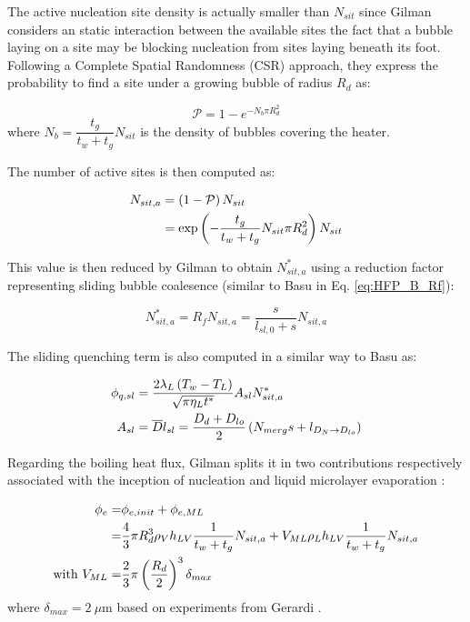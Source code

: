 The active nucleation site density is actually smaller than $N_{sit}$ since Gilman considers an static interaction between the available sites \ie the fact that a bubble laying on a site may be blocking nucleation from sites laying beneath its foot. Following a Complete Spatial Randomness (CSR) approach, they express the probability to find a site under a growing bubble of radius $R_{d}$ as:

\begin{equation}
\mathcal{P} = 1-e^{-N_{b}\pi R_{d}^{2}}
\label{eq:HFP_G_Pinter}
\end{equation} 
where $N_{b} = \dfrac{t_{g}}{t_{w}+t_{g}}N_{sit}$ is the density of bubbles covering the heater.

The number of active sites is then computed as:

\begin{align}
N_{sit,a} &= \parth{1-\mathcal{P}}N_{sit}\\
%
&= \exp{-\dfrac{t_{g}}{t_{w}+t_{g}}N_{sit}\pi R_{d}^{2}} N_{sit}
\label{eq:HFP_G_Nsita}
\end{align}

This value is then reduced by Gilman to obtain $N_{sit,a}^{*}$ using a reduction factor representing sliding bubble coalesence (similar to Basu in Eq. \ref{eq:HFP_B_Rf}):

\begin{equation}
N_{sit,a}^{*}=R_{f}N_{sit,a} = \frac{s}{l_{sl,0}+s} N_{sit,a}
\end{equation}


The sliding quenching term is also computed in a similar way to Basu as:

\begin{align}
\phi_{q,sl}&=\frac{2\lambda_{L}\parth{T_{w}-T_{L}}}{\sqrt{\pi \eta_{L}t^{*}}}A_{sl}N_{sit,a}^{*} \\
%
A_{sl} &= \overline{D}l_{sl} = \frac{D_{d}+D_{lo}}{2}\parth{N_{merg}s+l_{D_{N}\rightarrow D_{lo}}}
\end{align}

Regarding the boiling heat flux, Gilman splits it in two contributions respectively associated with the inception of nucleation and liquid microlayer evaporation :

\begin{align}
\phi_{e} =& \phi_{e,init} + \phi_{e,ML} \\
%
=& \frac{4}{3}\pi R_{d}^{3}\rho_{V} h_{LV} \frac{1}{t_{w}+t_{g}}N_{sit,a} + V_{ML} \rho_{L}h_{LV} \frac{1}{t_{w}+t_{g}}N_{sit,a}\\
\text{with } V_{ML} =& \frac{2}{3}\pi \parth{\frac{R_{d}}{2}}^{3}\delta_{max}
\end{align}
where $\delta_{max}=2\ \mu\text{m}$ based on experiments from Gerardi \cite{gerardi}.


